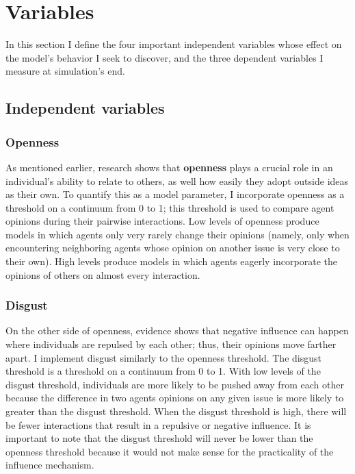 
\section{Variables}

In this section I define the four important independent variables whose effect
on the model's behavior I seek to discover, and the three dependent variables I
measure at simulation's end.

\subsection{Independent variables}

\subsubsection{Openness}

As mentioned earlier, research shows that \textbf{openness} plays a crucial role in an
individual's ability to relate to others, as well how easily they adopt outside
ideas as their own. To quantify this as a model parameter, I incorporate
openness as a threshold on a continuum from 0 to 1; this threshold is used to
compare agent opinions during their pairwise interactions. Low levels of
openness produce models in which agents only very rarely change their opinions
(namely, only when encountering neighboring agents whose opinion on another
issue is very close to their own). High levels produce models in which agents
eagerly incorporate the opinions of others on almost every interaction.

\subsubsection{Disgust}

On the other side of openness, evidence shows that negative influence can happen where individuals are repulsed by each other; thus, their opinions move farther apart. I implement disgust similarly to the openness threshold. The disgust threshold is a threshold on a continuum from 0 to 1. With low levels of the disgust threshold, individuals are more likely to be pushed away from each other because the difference in two agents opinions on any given issue is more likely to greater than the disgust threshold. When the disgust threshold is high, there will be fewer interactions that result in a repulsive or negative influence. It is important to note that the disgust threshold will never be lower than the openness threshold because it would not make sense for the practicality of the influence mechanism.   

